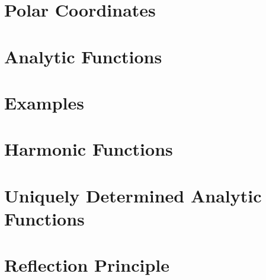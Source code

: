 \documentclass{book}
\theoremstyle{definition}
\begin{document}
\section{Polar Coordinates}
\section{Analytic Functions}
\section{Examples}
\section{Harmonic Functions}
\section{Uniquely Determined Analytic Functions}
\section{Reflection Principle}


\newpage
\end{document}
